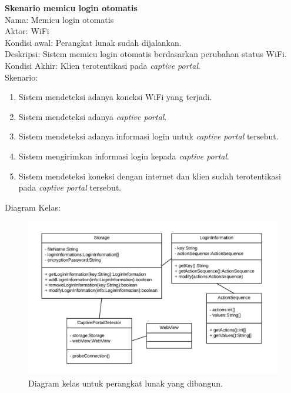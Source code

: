 \documentclass[a4paper,twoside]{article}
\begin{document}
\begin{enumerate}
        \textbf{Skenario memicu login otomatis}\\
        Nama: Memicu login otomatis\\
        Aktor: WiFi\\
        Kondisi awal: Perangkat lunak sudah dijalankan.\\
        Deskripsi: Sistem memicu login otomatis berdasarkan perubahan status WiFi.\\
        Kondisi Akhir: Klien terotentikasi pada \textit{captive portal}.\\
        Skenario:
        \begin{enumerate}
            \item{Sistem mendeteksi adanya koneksi WiFi yang terjadi.}
            \item{Sistem mendeteksi adanya \textit{captive portal}.}
            \item{Sistem mendeteksi adanya informasi login untuk \textit{captive portal} tersebut.}
            \item{Sistem mengirimkan informasi login kepada \textit{captive portal}.}
            \item{Sistem mendeteksi koneksi dengan internet dan klien sudah terotentikasi pada \textit{captive portal} tersebut.}
        \end{enumerate}
        
        Diagram Kelas:
        
        \begin{figure}[h]
            \centering
            \includegraphics[scale=0.85]{classdiagram.png}
            \caption[Diagram kelas untuk perangkat lunak yang dibangun.]{Diagram kelas untuk perangkat lunak yang dibangun.}
            \label{fig:diagramkelas}
        \end{figure}
        

\end{enumerate}
\end{document}

